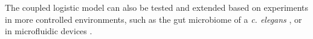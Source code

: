 \documentclass[a4paper,10pt]{article}
\numberwithin{equation}{section} %
\begin{document}
The coupled logistic model can also be tested and extended based on experiments in more controlled environments, such as the gut microbiome of a \textit{c. elegans} \cite{Vega2016}, or in microfluidic devices \cite{Hung2005}.





\iffalse



\end{document}
